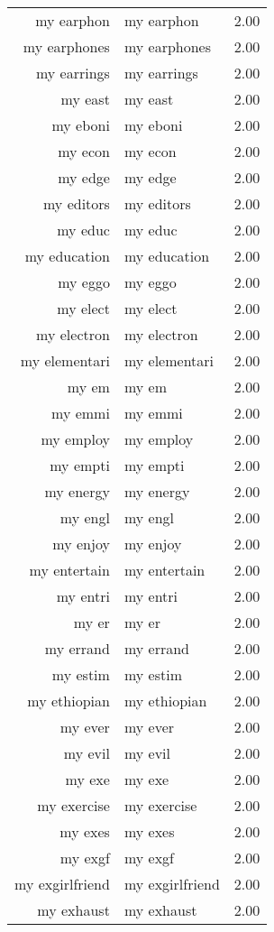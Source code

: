 \begin{table}[ht]
\begin{tabular}{rlr}
  my earphon & my earphon & 2.00 \\ 
  my earphones & my earphones & 2.00 \\ 
  my earrings & my earrings & 2.00 \\ 
  my east & my east & 2.00 \\ 
  my eboni & my eboni & 2.00 \\ 
  my econ & my econ & 2.00 \\ 
  my edge & my edge & 2.00 \\ 
  my editors & my editors & 2.00 \\ 
  my educ & my educ & 2.00 \\ 
  my education & my education & 2.00 \\ 
  my eggo & my eggo & 2.00 \\ 
  my elect & my elect & 2.00 \\ 
  my electron & my electron & 2.00 \\ 
  my elementari & my elementari & 2.00 \\ 
  my em & my em & 2.00 \\ 
  my emmi & my emmi & 2.00 \\ 
  my employ & my employ & 2.00 \\ 
  my empti & my empti & 2.00 \\ 
  my energy & my energy & 2.00 \\ 
  my engl & my engl & 2.00 \\ 
  my enjoy & my enjoy & 2.00 \\ 
  my entertain & my entertain & 2.00 \\ 
  my entri & my entri & 2.00 \\ 
  my er & my er & 2.00 \\ 
  my errand & my errand & 2.00 \\ 
  my estim & my estim & 2.00 \\ 
  my ethiopian & my ethiopian & 2.00 \\ 
  my ever & my ever & 2.00 \\ 
  my evil & my evil & 2.00 \\ 
  my exe & my exe & 2.00 \\ 
  my exercise & my exercise & 2.00 \\ 
  my exes & my exes & 2.00 \\ 
  my exgf & my exgf & 2.00 \\ 
  my exgirlfriend & my exgirlfriend & 2.00 \\ 
  my exhaust & my exhaust & 2.00 \\ 

\end{tabular}
\end{table}
